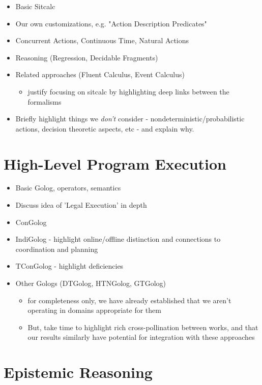 \begin{itemize}
\item Basic Sitcalc
\item Our own customizations, e.g. "Action Description Predicates"
\item Concurrent Actions, Continuous Time, Natural Actions
\item Reasoning (Regression, Decidable Fragments)
\item Related approaches (Fluent Calculus, Event Calculus)
  \begin{itemize}
  \item justify focusing on sitcalc by highlighting deep links between the formalisms
  \end{itemize}
\item Briefly highlight things we \emph{don't} consider - nondeterministic/probabilistic actions, decision theoretic aspects, etc - and explain why.
\end{itemize}

\section{High-Level Program Execution}

\begin{itemize}
\item Basic Golog, operators, semantics
\item Discuss idea of 'Legal Execution' in depth
\item ConGolog
\item IndiGolog - highlight online/offline distinction and connections to coordination and planning
\item TConGolog - highlight deficiencies
\item Other Gologs (DTGolog, HTNGolog, GTGolog)
  \begin{itemize}
  \item for completeness only, we have already established that we aren't operating in domains appropriate for them
  \item But, take time to highlight rich cross-pollination between works, and that our results similarly have potential for integration with these approaches
  \end{itemize}
\end{itemize}

\section{Epistemic Reasoning}

